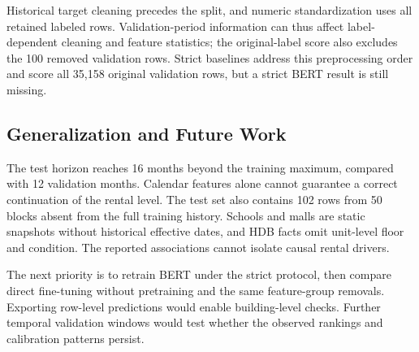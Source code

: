 Historical target cleaning precedes the split, and numeric standardization uses all retained labeled rows.  Validation-period information can thus affect label-dependent cleaning and feature statistics; the original-label score also excludes the 100 removed validation rows.  Strict baselines address this preprocessing order and score all 35,158 original validation rows, but a strict BERT result is still missing.

\subsection{Generalization and Future Work}
The test horizon reaches 16 months beyond the training maximum, compared with 12 validation months.  Calendar features alone cannot guarantee a correct continuation of the rental level.  The test set also contains 102 rows from 50 blocks absent from the full training history.  Schools and malls are static snapshots without historical effective dates, and HDB facts omit unit-level floor and condition.  The reported associations cannot isolate causal rental drivers.

The next priority is to retrain BERT under the strict protocol, then compare direct fine-tuning without pretraining and the same feature-group removals.  Exporting row-level predictions would enable building-level checks.  Further temporal validation windows would test whether the observed rankings and calibration patterns persist.
